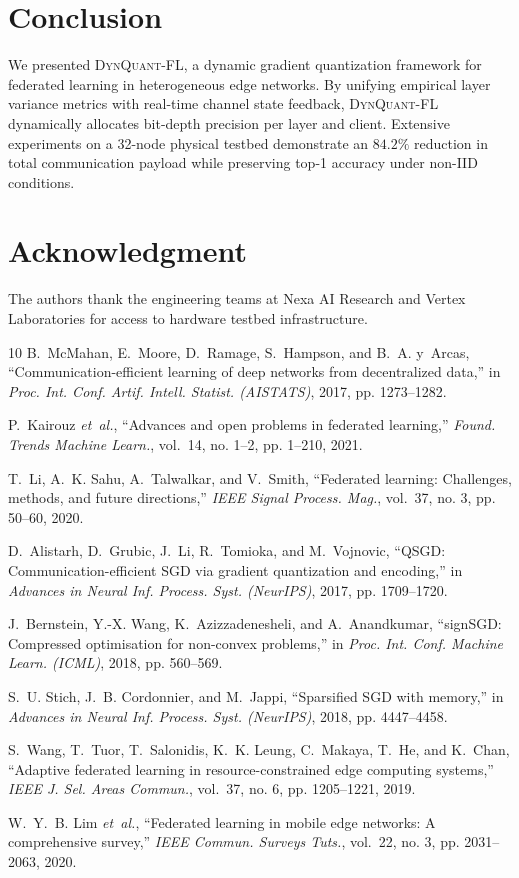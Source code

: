 \documentclass[conference]{IEEEtran}
\begin{document}
\section{Conclusion}
We presented \textsc{DynQuant-FL}, a dynamic gradient quantization framework for federated learning in heterogeneous edge networks. By unifying empirical layer variance metrics with real-time channel state feedback, \textsc{DynQuant-FL} dynamically allocates bit-depth precision per layer and client. Extensive experiments on a 32-node physical testbed demonstrate an $84.2\%$ reduction in total communication payload while preserving top-1 accuracy under non-IID conditions.

\section*{Acknowledgment}
The authors thank the engineering teams at Nexa AI Research and Vertex Laboratories for access to hardware testbed infrastructure.

\begin{thebibliography}{10}
B.~McMahan, E.~Moore, D.~Ramage, S.~Hampson, and B.~A. y~Arcas, ``Communication-efficient learning of deep networks from decentralized data,'' in \emph{Proc. Int. Conf. Artif. Intell. Statist. (AISTATS)}, 2017, pp. 1273--1282.

P.~Kairouz \emph{et~al.}, ``Advances and open problems in federated learning,'' \emph{Found. Trends Machine Learn.}, vol.~14, no. 1--2, pp. 1--210, 2021.

T.~Li, A.~K. Sahu, A.~Talwalkar, and V.~Smith, ``Federated learning: Challenges, methods, and future directions,'' \emph{IEEE Signal Process. Mag.}, vol.~37, no. 3, pp. 50--60, 2020.

D.~Alistarh, D.~Grubic, J.~Li, R.~Tomioka, and M.~Vojnovic, ``QSGD: Communication-efficient SGD via gradient quantization and encoding,'' in \emph{Advances in Neural Inf. Process. Syst. (NeurIPS)}, 2017, pp. 1709--1720.

J.~Bernstein, Y.-X. Wang, K.~Azizzadenesheli, and A.~Anandkumar, ``signSGD: Compressed optimisation for non-convex problems,'' in \emph{Proc. Int. Conf. Machine Learn. (ICML)}, 2018, pp. 560--569.

S.~U. Stich, J.~B. Cordonnier, and M.~Jappi, ``Sparsified SGD with memory,'' in \emph{Advances in Neural Inf. Process. Syst. (NeurIPS)}, 2018, pp. 4447--4458.

S.~Wang, T.~Tuor, T.~Salonidis, K.~K. Leung, C.~Makaya, T.~He, and K.~Chan, ``Adaptive federated learning in resource-constrained edge computing systems,'' \emph{IEEE J. Sel. Areas Commun.}, vol.~37, no. 6, pp. 1205--1221, 2019.

W.~Y.~B. Lim \emph{et~al.}, ``Federated learning in mobile edge networks: A comprehensive survey,'' \emph{IEEE Commun. Surveys Tuts.}, vol.~22, no. 3, pp. 2031--2063, 2020.

\end{thebibliography}
\end{document}
